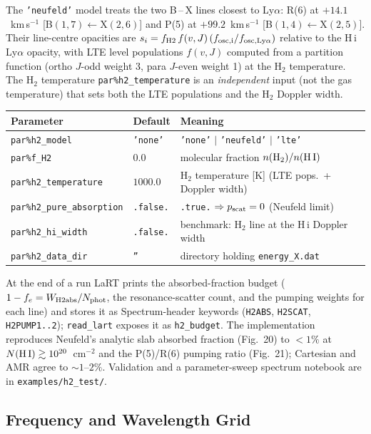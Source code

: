 \documentclass[english,a4paper]{my_memo}
\newcommand{\parm}[1]{\texttt{par\%#1}}
\begin{document}
The \texttt{'neufeld'} model treats the two B\,--\,X lines closest to Ly$\alpha$:
R(6) at $+14.1$~km\,s$^{-1}$ [B$(1,7)\leftarrow$X$(2,6)$] and P(5) at
$+99.2$~km\,s$^{-1}$ [B$(1,4)\leftarrow$X$(2,5)$]. Their line-centre opacities are
$s_i = f_{\rm H2}\,f(v,J)\,(f_{\rm osc,i}/f_{\rm osc,Ly\alpha})$ relative to the
H\,{\sc i} Ly$\alpha$ opacity, with LTE level populations $f(v,J)$ computed from a
partition function (ortho $J$-odd weight 3, para $J$-even weight 1) at the H$_2$
temperature. The H$_2$ temperature \parm{h2\_temperature} is an \emph{independent}
input (not the gas temperature) that sets both the LTE populations and the H$_2$
Doppler width.

\begin{center}
\begin{tabular}{lll}
\hline
Parameter & Default & Meaning \\
\hline
\parm{h2\_model}            & \texttt{'none'} & \texttt{'none'} $|$ \texttt{'neufeld'} $|$ \texttt{'lte'} \\
\parm{f\_H2}                & $0.0$           & molecular fraction $n({\rm H_2})/n({\rm H\,I})$ \\
\parm{h2\_temperature}      & $1000.0$        & H$_2$ temperature [K] (LTE pops.\ + Doppler width) \\
\parm{h2\_pure\_absorption} & \texttt{.false.} & \texttt{.true.} $\Rightarrow p_{\rm scat}=0$ (Neufeld limit) \\
\parm{h2\_hi\_width}        & \texttt{.false.} & benchmark: H$_2$ line at the H\,{\sc i} Doppler width \\
\parm{h2\_data\_dir}        & \texttt{''}     & directory holding \texttt{energy\_X.dat} \\
\hline
\end{tabular}
\end{center}

At the end of a run LaRT prints the absorbed-fraction budget
($1-f_e = W_{\rm H2abs}/N_{\rm phot}$, the resonance-scatter count, and the pumping weights
for each line) and stores it as Spectrum-header keywords
(\texttt{H2ABS}, \texttt{H2SCAT}, \texttt{H2PUMP1..2}); \texttt{read\_lart} exposes
it as \texttt{h2\_budget}. The implementation reproduces Neufeld's analytic slab
absorbed fraction (Fig.~20) to $<1\%$ at $N({\rm H\,I})\gtrsim10^{20}$~cm$^{-2}$ and
the P(5)/R(6) pumping ratio (Fig.~21); Cartesian and AMR agree to $\sim1$--$2\%$.
Validation and a parameter-sweep spectrum notebook are in
\texttt{examples/h2\_test/}.

\subsection{Frequency and Wavelength Grid}
\label{sec:freqgrid}
\end{document}
